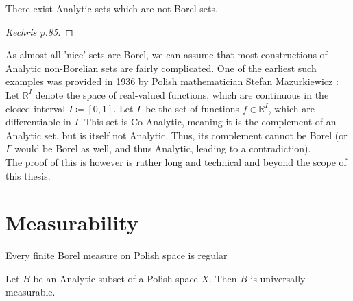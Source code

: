 \documentclass[10pt, a4paper, titlepage]{article}
\numberwithin{equation}{section}
\begin{document}
\begin{theorem}[Souslin]
	There exist Analytic sets which are not Borel sets. 
\end{theorem}
\begin{proof}
	[Kechris p.85]
\end{proof}



\begin{example}
	As almost all 'nice' sets are Borel, we can assume that most constructions of Analytic non-Borelian sets are fairly complicated. 
	One of the earliest such examples was provided in 1936 by Polish mathematician Stefan Mazurkiewicz \cite{mazurkiewicz1936}:\\
	Let $\mathbb{R}^I$ denote the space of real-valued functions, which are continuous in the closed interval $I \coloneq[0,1]$. Let  $\Gamma$ be the set of functions  $f \in \mathbb{R}^I$, which are differentiable in $I$. This set is Co-Analytic, meaning it is the complement of an Analytic set, but is itself not Analytic. 
	Thus, its complement cannot be Borel (or $\Gamma$ would be Borel as well, and thus Analytic, leading to a contradiction). \\
	The proof of this is however is rather long and technical and beyond the scope of this thesis.
	
\end{example}



\section{Measurability}

\begin{definition}[$\mu$-Measurable]
	
\end{definition}

\begin{definition}
	
\end{definition}

\begin{theorem}
	Every finite Borel measure on Polish space is regular
\end{theorem}

\begin{theorem}
	Let $B$ be an Analytic subset of a Polish space $X$. Then $B$ is universally measurable.
\end{theorem}
\end{document}
